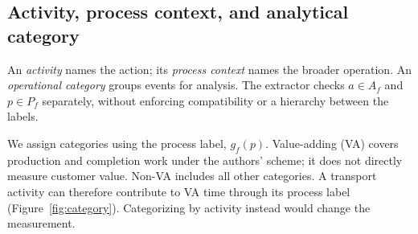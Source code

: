 \subsection{Activity, process context, and analytical category}
An \emph{activity} names the action; its \emph{process context} names the broader operation. An \emph{operational category} groups events for analysis. The extractor checks $a\in A_f$ and $p\in P_f$ separately, without enforcing compatibility or a hierarchy between the labels.

We assign categories using the process label, $g_f(p)$. Value-adding (VA) covers production and completion work under the authors' scheme; it does not directly measure customer value. Non-VA includes all other categories. A transport activity can therefore contribute to VA time through its process label (Figure~\ref{fig:category}). Categorizing by activity instead would change the measurement.
